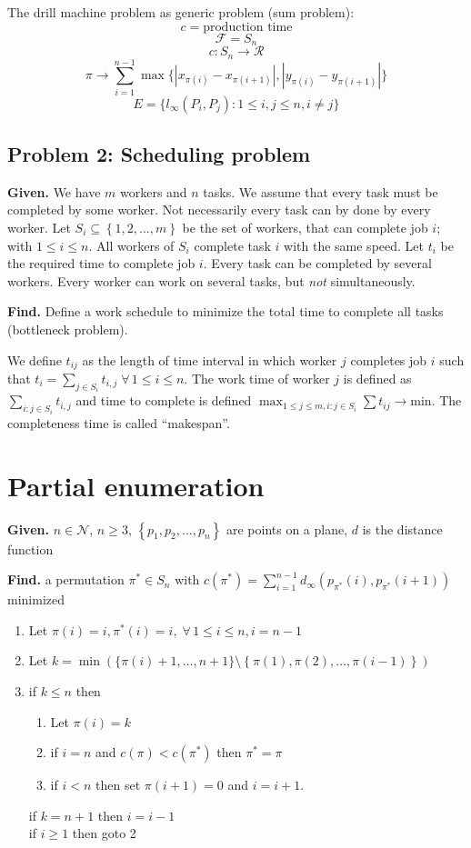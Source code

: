 \documentclass[a4paper]{article}
\theoremstyle{definition}
\newcommand{\set}[1]{\left\{#1\right\}}
\newcommand{\given}[1]{\textbf{Given.} #1\par}
\newcommand{\find}[1]{\textbf{Find.} #1\par}
\newcommand{\fall}{\;\forall\,}
\begin{document}
The drill machine problem as generic problem (sum problem):
\[
    c = \text{production time}
\] \[
    \mathcal{F} = S_n
\] \[
    c: S_n \rightarrow \mathcal{R}
\] \[
    \pi \rightarrow \sum_{i=1}^{n-1} \max\{|x_{\pi(i)} - x_{\pi(i+1)}|, |y_{\pi(i)} - y_{\pi(i+1)}|\}
\] \[
    E = \{l_\infty(P_i, P_j): 1 \leq i, j \leq n, i \neq j\}
\]

\subsection{Problem 2: Scheduling problem}
%
\given{We have $m$ workers and $n$ tasks. We assume that every task must be completed by some worker. Not necessarily every task can by done by every worker. Let $S_i \subseteq \set{1, 2, \ldots, m}$ be the set of workers, that can complete job $i$; with $1 \leq i \leq n$. All workers of $S_i$ complete task $i$ with the same speed. Let $t_i$ be the required time to complete job $i$. Every task can be completed by several workers. Every worker can work on several tasks, but \emph{not} simultaneously.}
\find{Define a work schedule to minimize the total time to complete all tasks (bottleneck problem).}

We define $t_{ij}$ as the length of time interval in which worker $j$ completes job $i$ such that $t_i = \sum_{j \in S_i} t_{i,j} \fall 1 \leq i \leq n$. The work time of worker $j$ is defined as $\sum_{i: j \in S_i} t_{i,j}$ and time to complete is defined $\max_{1 \leq j \leq m, i: j \in S_i} \sum t_{ij} \rightarrow \text{min}$. The completeness time is called ``makespan''.

\section{Partial enumeration}
%
\given{$n \in \mathcal{N}$, $n \geq 3$, $\set{p_1, p_2, \ldots, p_n}$ are points on a plane, $d$ is the distance function}
\find{a permutation $\pi^* \in S_n$ with $c(\pi^*) = \sum_{i=1}^{n-1} d_\infty(p_{\pi^*}(i), p_{\pi^*}(i+1))$ minimized}

\begin{enumerate}
  \item Let $\pi(i) = i, \pi^*(i) = i, \fall 1 \leq i \leq n, i = n - 1$
  \item Let $k = \min(\{\pi(i) + 1, \ldots, n+1\} \setminus \set{\pi(1), \pi(2), \ldots, \pi(i-1)})$
  \item if $k \leq n$ then
    \begin{enumerate}
      \item Let $\pi(i) = k$
      \item if $i = n$ and $c(\pi) < c(\pi^*)$ then $\pi^* = \pi$
      \item if $i < n$ then set $\pi(i+1) = 0$ and $i = i + 1$.
    \end{enumerate}
    if $k = n + 1$ then $i = i - 1$ \\
    if $i \geq 1$ then goto 2
\end{enumerate}
\end{document}
